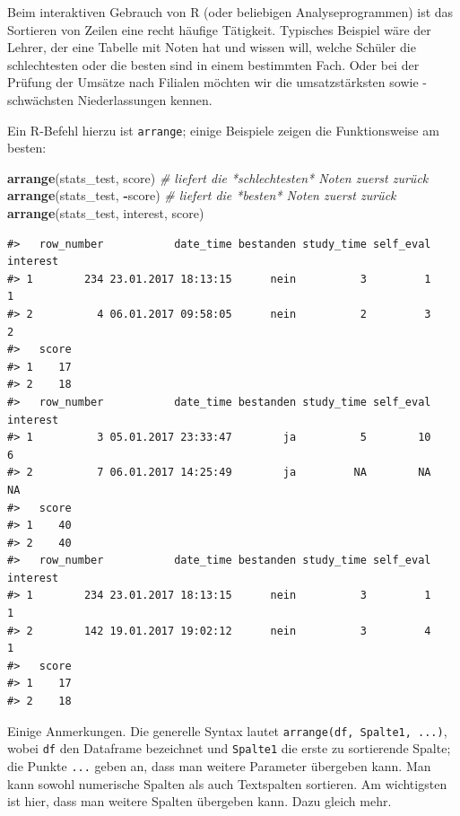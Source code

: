 \documentclass[12pt,ngerman,]{book}
\makeatletter
\newenvironment{Shaded}{\begin{snugshade}}{\end{snugshade}}
\newcommand{\KeywordTok}[1]{\textcolor[rgb]{0.13,0.29,0.53}{\textbf{#1}}}
\newcommand{\CommentTok}[1]{\textcolor[rgb]{0.56,0.35,0.01}{\textit{#1}}}
\newcommand{\OperatorTok}[1]{\textcolor[rgb]{0.81,0.36,0.00}{\textbf{#1}}}
\newcommand{\NormalTok}[1]{#1}
\newenvironment{kframe}{%
\medskip{}
\setlength{\fboxsep}{.8em}
 \def\at@end@of@kframe{}%
 \ifinner\ifhmode%
  \def\at@end@of@kframe{\end{minipage}}%
  \begin{minipage}{\columnwidth}%
 \fi\fi%
 \def\FrameCommand##1{\hskip\@totalleftmargin \hskip-\fboxsep
 \colorbox{shadecolor}{##1}\hskip-\fboxsep
     \hskip-\linewidth \hskip-\@totalleftmargin \hskip\columnwidth}%
 \MakeFramed {\advance\hsize-\width
   \@totalleftmargin\z@ \linewidth\hsize
   \@setminipage}}%
 {\par\unskip\endMakeFramed%
 \at@end@of@kframe}
\renewenvironment{Shaded}{\begin{kframe}}{\end{kframe}}
\theoremstyle{definition}
\theoremstyle{definition}
\theoremstyle{remark}
\makeatother
\begin{document}
Beim interaktiven Gebrauch von R (oder beliebigen Analyseprogrammen) ist
das Sortieren von Zeilen eine recht häufige Tätigkeit. Typisches
Beispiel wäre der Lehrer, der eine Tabelle mit Noten hat und wissen
will, welche Schüler die schlechtesten oder die besten sind in einem
bestimmten Fach. Oder bei der Prüfung der Umsätze nach Filialen möchten
wir die umsatzstärksten sowie -schwächsten Niederlassungen kennen.

Ein R-Befehl hierzu ist \texttt{arrange}; einige
Beispiele zeigen die Funktionsweise am besten:

\begin{Shaded}
\begin{Highlighting}[]

\KeywordTok{arrange}\NormalTok{(stats_test, score) }\CommentTok{# liefert die *schlechtesten* Noten zuerst zurück}
\KeywordTok{arrange}\NormalTok{(stats_test, }\OperatorTok{-}\NormalTok{score) }\CommentTok{# liefert die *besten* Noten zuerst zurück}
\KeywordTok{arrange}\NormalTok{(stats_test, interest, score)}
\end{Highlighting}
\end{Shaded}

\begin{verbatim}
#>   row_number           date_time bestanden study_time self_eval interest
#> 1        234 23.01.2017 18:13:15      nein          3         1        1
#> 2          4 06.01.2017 09:58:05      nein          2         3        2
#>   score
#> 1    17
#> 2    18
#>   row_number           date_time bestanden study_time self_eval interest
#> 1          3 05.01.2017 23:33:47        ja          5        10        6
#> 2          7 06.01.2017 14:25:49        ja         NA        NA       NA
#>   score
#> 1    40
#> 2    40
#>   row_number           date_time bestanden study_time self_eval interest
#> 1        234 23.01.2017 18:13:15      nein          3         1        1
#> 2        142 19.01.2017 19:02:12      nein          3         4        1
#>   score
#> 1    17
#> 2    18
\end{verbatim}

Einige Anmerkungen. Die generelle Syntax lautet
\texttt{arrange(df,\ Spalte1,\ ...)}, wobei \texttt{df} den Dataframe
bezeichnet und \texttt{Spalte1} die erste zu sortierende Spalte; die
Punkte \texttt{...} geben an, dass man weitere Parameter übergeben kann.
Man kann sowohl numerische Spalten als auch Textspalten sortieren. Am
wichtigsten ist hier, dass man weitere Spalten übergeben kann. Dazu
gleich mehr.
\end{document}
